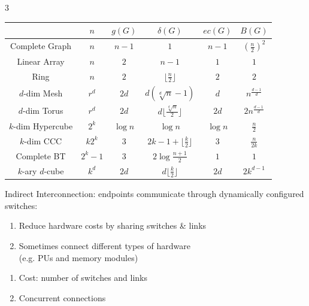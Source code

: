 \documentclass[12pt, a4paper]{article}
\begin{document}
\begin{multicols*}{3}
\renewcommand{\arraystretch}{1.05}
\setlength{\tabcolsep}{3pt}
\begin{tabular}{|c|c|c|c|c|c|}
\hline
& $n$ & $g(G)$ & $\delta(G)$ & $ec(G)$ & $B(G)$ \\\hline
Complete Graph & $n$ & $n-1$ & $1$ & $n-1$ & $(\frac{n}{2})^2$\\\hline 
Linear Array & $n$ & $2$ & $n-1$ & $1$ & $1$\\\hline
Ring & $n$ & $2$ & $\lfloor \frac{n}{2}\rfloor$ & $2$ & $2$\\\hline
$d$-dim Mesh & $r^d$ & $2d$ & $d(\sqrt[d]{n} - 1)$ & $d$ & $n^{\frac{d-1}{d}}$\\\hline
$d$-dim Torus & $r^d$ & $2d$ & $d\lfloor \frac{\sqrt[d]{n}}{2}\rfloor$ & $2d$ & $2n^{\frac{d-1}{d}}$\\\hline
$k$-dim Hypercube & $2^k$ & $\log n$ & $\log n$ & $\log n$ & $\frac{n}{2}$\\\hline
$k$-dim CCC & $k2^k$ & $3$ & $2k-1 + \lfloor \frac{k}{2}\rfloor$ & $3$ & $\frac{n}{2k}$\\\hline
Complete BT & $2^k-1$ & $3$ & $2\log \frac{n+1}{2}$ & $1$ & $1$\\\hline
$k$-ary $d$-cube & $k^d$ & $2d$ & $d\lfloor \frac{k}{2}\rfloor$ & $2d$ & $2k^{d-1}$\\\hline
\end{tabular}

\colbreak
Indirect Interconnection: endpoints communicate through dynamically configured switches:
\begin{enumerate}[$+$]
  \item Reduce hardware costs by sharing switches \& links
  \item Sometimes connect different types of hardware\\(e.g. PUs and memory modules)
\end{enumerate}\vspace{-3pt}
\begin{enumerate}[\roman*.]
  \item Cost: number of switches and links 
  \item Concurrent connections
\end{enumerate}


\end{multicols*}
\end{document}

